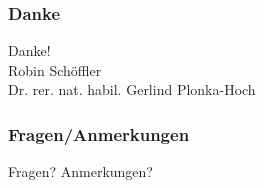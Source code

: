 \documentclass[8pt, aspectratio=169]{beamer}
\begin{document}
\begin{frame}
	\frametitle{Danke}
	\vspace{-1.5cm}\hspace{-0.5cm}
	\begin{minipage}[t]{\textwidth}
		\centering\Huge
		Danke!\\[0.3em]
		\normalsize
		Robin Schöffler\\[0.3em]
		Dr. rer. nat. habil. Gerlind Plonka-Hoch
	\end{minipage}
\end{frame}

\begin{frame}
	\frametitle{Fragen/Anmerkungen}
	\vspace{-1.5cm}\hspace{-0.5cm}
	\begin{minipage}[t]{\textwidth}
		\centering\Huge
		Fragen? Anmerkungen?
	\end{minipage}
\end{frame}
\end{document}
